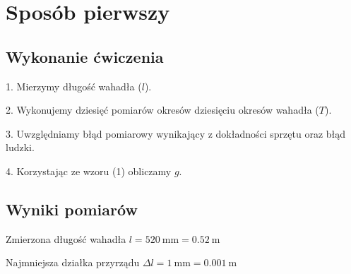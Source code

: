 \documentclass{fizykalab}
\def\pomvspace{\vspace{0.3em}}
\begin{document}
\newpage

\section*{Sposób pierwszy}
 {\setlength{\parindent}{0pt}
  \subsection*{Wykonanie ćwiczenia}
  \par
  1. Mierzymy długość wahadła ($l$).

  2. Wykonujemy dziesięć pomiarów okresów dziesięciu okresów wahadła ($T$).

  3. Uwzględniamy błąd pomiarowy wynikający z dokładności sprzętu oraz błąd ludzki.

  4. Korzystając ze wzoru (1) obliczamy $g$.


  \subsection*{Wyniki pomiarów}
  \par
  Zmierzona długość wahadła \quad $l = \SI{520}{\milli\meter} = \SI{0.52}{\meter}$
  \pomvspace

  Najmniejsza działka przyrządu \quad $ \Delta l = \SI{1}{\milli\meter} = \SI{0.001}{\meter} $
  \pomvspace

}
\end{document}
